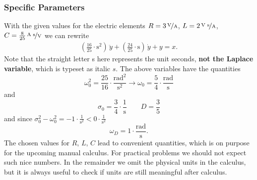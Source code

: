\documentclass[11pt,a4paper,DIV=12]{scrartcl}
\begin{document}
\subsubsection{Specific Parameters}
With the given values for the electric elements
$R = 3\,\nicefrac{\text{V}}{\text{A}}$,
$L=2\,\nicefrac{\text{V s}}{\text{A}}$,
$C=\frac{8}{25}\,\nicefrac{\text{A s}}{\text{V}}$
we can rewrite 
\begin{align}
\boxed{
(\frac{16}{25} \cdot \text{s}^2) \, \ddot{y} + (\frac{24}{25} \cdot \text{s})
\, \dot{y} + y = x.
}
\end{align}
Note that the straight letter s here represents the unit seconds, \textbf{not the Laplace
variable}, which is typeset as italic $s$.
%
The above variables have the quantities
\begin{equation}
\omega_0^2 = \frac{25}{16} \cdot \frac{\text{rad}^2}{\text{s}^2}
\rightarrow \omega_0 = \frac{5}{4} \cdot \frac{\text{rad}}{\text{s}}
\end{equation}
and
\begin{equation}
\sigma_0 = \frac{3}{4}\cdot \frac{\text{1}}{\text{s}}
\qquad D = \frac{3}{5}
\end{equation}
and since $\sigma_0^2 - \omega_0^2 = -1 \cdot \frac{1}{\text{s}^2}< 0\cdot \frac{1}{\text{s}^2}$
\begin{equation}
\omega_D = 1 \cdot \frac{\text{rad}}{\text{s}}.
\end{equation}
%
The chosen values for $R$, $L$, $C$ lead to convenient quantities, which is on
purpose for the upcoming manual calculus. For practical problems we should not
expect such nice numbers.
%
In the remainder we omit the physical units in the calculus, but it is always
useful to check if units are still meaningful after calculus.



\end{document}
